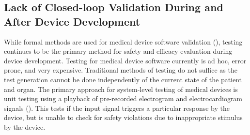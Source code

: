 \subsection{Lack of Closed-loop Validation During and After Device Development}
While formal methods are used for medical device software validation (\cite{challenge, challenge2, challenge3}), testing continues to be the primary method for safety and efficacy evaluation during device development.
Testing for medical device software currently is ad hoc, error prone, and very expensive. 
Traditional methods of testing do not suffice as the test generation cannot be done independently of the current state of the patient and organ. 
The primary approach for system-level testing of medical devices is unit testing using a playback of pre-recorded electrogram and electrocardiogram signals (\cite{testing_imd, Vip}). 
This tests if the input signal triggers a particular response by the device, but is unable to check for safety violations due to inappropriate stimulus by the device. 

